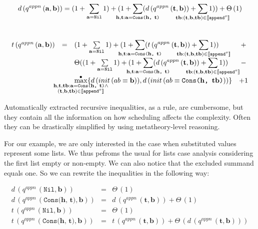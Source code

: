 \[
d\,(q^{appn}\,(\mathbf{a}, \mathbf{b}))  = (1 + \sum\limits_{\mathbf{a} = \texttt{Nil}} 1) + (1 + \smashoperator{\sum\limits_{\mathbf{h}, \mathbf{t}: \mathbf{a} = \texttt{Cons($\mathbf{h}$, $\mathbf{t}$)}}} (d\,(q^{appn}\,(\mathbf{t}, \mathbf{b})) + \smashoperator{\sum\limits_{\mathbf{tb} : (\mathbf{t}, \mathbf{b}, \mathbf{tb}) \in \llbracket \texttt{append$^o$} \rrbracket}} 1)) + \Theta\,(1)
\]\\[0.8mm]
\[
\begin{array}{lclc}
t\,(q^{appn}\,(\mathbf{a}, \mathbf{b})) & = & (1 + \sum\limits_{\mathbf{a} = \texttt{Nil}} 1) + (1 + \smashoperator{\sum\limits_{\mathbf{h}, \mathbf{t}: \mathbf{a} = \texttt{Cons($\mathbf{h}$, $\mathbf{t}$)}}} (t\,(q^{appn}\,(\mathbf{t}, \mathbf{b})) + \smashoperator{\sum\limits_{\mathbf{tb} : (\mathbf{t}, \mathbf{b}, \mathbf{tb}) \in \llbracket \texttt{append$^o$} \rrbracket}} 1)) & + \\
 & &\Theta((1 + \sum\limits_{\mathbf{a} = \texttt{Nil}} 1) + (1 + \smashoperator{\sum\limits_{\mathbf{h}, \mathbf{t}: \mathbf{a} = \texttt{Cons($\mathbf{h}$, $\mathbf{t}$)}}} (d\,(q^{appn}\,(\mathbf{t}, \mathbf{b})) + \smashoperator{\sum\limits_{\mathbf{tb} : (\mathbf{t}, \mathbf{b}, \mathbf{tb}) \in \llbracket \texttt{append$^o$} \rrbracket}} 1)) & - \\
& & \smashoperator{\maxd\limits_{\substack{
                                   \mathbf{h}, \mathbf{t}, \mathbf{tb}: \mathbf{a} = \texttt{Cons($\mathbf{h}$, $\mathbf{t}$)} \land \\
                                   (\mathbf{t}, \mathbf{b}, \mathbf{tb}) \in \llbracket \texttt{append$^o$} \rrbracket
                                 }
                                }} \{ d\,(init\,(\unigoal{ab}{\mathbf{b}})), d\,(init\,(\unigoal{ab}{\texttt{Cons($\mathbf{h}$, $\mathbf{tb}$)}})) \} & + 1 
\end{array}
\]


Automatically extracted recursive inequalities, as a rule, are cumbersome, but they contain all the information on how scheduling affects the complexity.
Often they can be drastically simplified by using metatheory-level reasoning.

For our example, we are only interested in the case when substituted values represent some lists. We thus pefroms the usual for lists case analysis
considering the first list empty or non-empty. We can also notice that the excluded summand equals one. So we can rewrite the inequalities in the following way:

\[
\begin{array}{lcl}
d\,(q^{appn}\,(\texttt{Nil}, \mathbf{b})) & = & \Theta\,(1) \\
d\,(q^{appn}\,(\texttt{Cons($\mathbf{h}$, $\mathbf{t}$)}, \mathbf{b})) & = & d\,(q^{appn}\,(\mathbf{t}, \mathbf{b})) + \Theta\,(1) \\
t\,(q^{appn}\,(\texttt{Nil}, \mathbf{b})) & = & \Theta\,(1) \\
t\,(q^{appn}\,(\texttt{Cons($\mathbf{h}$, $\mathbf{t}$)}, \mathbf{b})) & = & t\,(q^{appn}\,(\mathbf{t}, \mathbf{b})) + \Theta\,(d\,(q^{appn}\,(\mathbf{t}, \mathbf{b}))) \\
\end{array}
 \]
 
